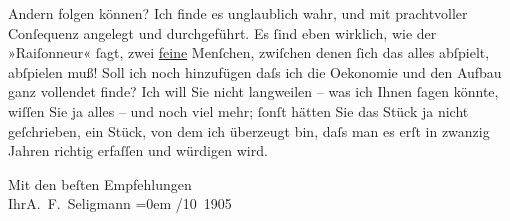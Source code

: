                Andern folgen können? Ich finde es unglaublich wahr, und mit prachtvoller Conſequenz
               angelegt und durchgeführt. Es ſind eben wirklich, wie der »Raiſonneur« ſagt, zwei
                  \uline{feine} Menſchen, zwiſchen denen ſich das alles
               abſpielt, abſpielen muß! Soll ich noch hinzufügen daſs ich die Oekonomie und den
               Aufbau ganz vollendet finde? Ich will Sie nicht langweilen – was ich Ihnen ſagen
               könnte, wiſſen Sie {\pb}ja alles – und noch viel mehr; ſonſt hätten Sie das
                  Stück ja nicht geſchrieben,
               ein Stück, von dem ich
               überzeugt bin, daſs man es erſt in zwanzig Jahren richtig erfaſſen und würdigen
               wird.\pend
           
\pstart
           Mit den beſten Empfehlungen{\\[\baselineskip]}Ihr\spacefill\mbox{A. F. Seligmann}\pend
           \leftskip=0em{}
/10 1905\pend
           \endnumbering{}  
      